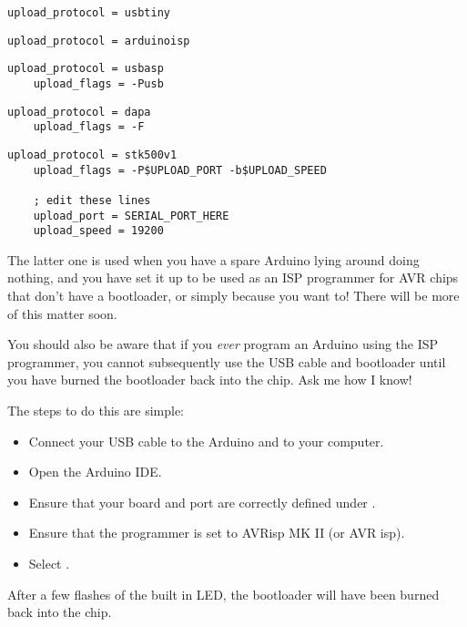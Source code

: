 \begin{lstlisting}[caption={The \inline{platformio.ini} additions for `USBTinyISP' Programmer}]
    upload_protocol = usbtiny
\end{lstlisting}


\begin{lstlisting}[caption={The \inline{platformio.ini} additions for `ArduinoISP` Programmer}]
    upload_protocol = arduinoisp
\end{lstlisting}


\begin{lstlisting}[caption={The \inline{platformio.ini} additions for `USBasp' ISP Programmer}]
    upload_protocol = usbasp
    upload_flags = -Pusb
\end{lstlisting}


\begin{lstlisting}[caption={The \inline{platformio.ini} additions for `Parallel Port' ISP Programmer}]
    upload_protocol = dapa
    upload_flags = -F
\end{lstlisting}


\begin{lstlisting}[caption={The \inline{platformio.ini} additions for `Arduino as ISP` Programmer}]
    upload_protocol = stk500v1
    upload_flags = -P$UPLOAD_PORT -b$UPLOAD_SPEED

    ; edit these lines
    upload_port = SERIAL_PORT_HERE
    upload_speed = 19200
\end{lstlisting}

The latter one is used when you have a spare  Arduino lying around doing nothing, and you have set it up to be used as an ISP programmer for AVR chips that don't have a bootloader, or simply because you want to! There will be more of this matter soon.

\begin{warning}
You should also be aware that if you \emph{ever} program an  Arduino using the ISP programmer, you cannot subsequently use the USB cable and bootloader until you have burned the bootloader back into the chip. Ask me how I know! 

The steps to do this are simple:

\begin{itemize}
\item Connect your USB cable to the  Arduino and to your computer.
\item Open the  Arduino IDE.
\item Ensure that your board and port are correctly defined under .
\item Ensure that the programmer is set to AVRisp MK II (or AVR isp).
\item Select .
\end{itemize}

After a few flashes of the built in LED, the bootloader will have been burned back into the chip. 
\end{warning}

